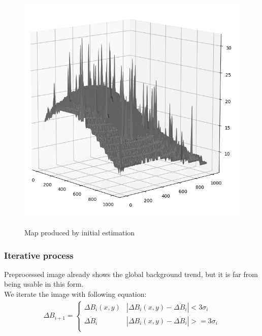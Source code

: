\documentclass[12pt, a4paper, oneside]{book}
\begin{document}
\begin{figure}[!hbt]
    \begin{center}
        \includegraphics[scale=1.30]{images/background_initial_guess.png}
        \label{img:background_initial_guess}
        \caption{Map produced by initial estimation}
    \end{center}
\end{figure}

\subsubsection{Iterative process}
Preprocessed image already shows the global background trend, but it is far from being usable in this form.\\
We iterate the image with following equation: \\
\begin{gather}
    \Delta B_{i+1} =
    \begin{cases}
        \Delta B_i(x,y) & |\Delta B_i(x,y)-\overline{\Delta B_i}| < 3\sigma_i\\
        \overline{\Delta B_i}& |\Delta B_i(x,y)-\overline{\Delta B_i}| >= 3\sigma_i\\
    \end{cases}
\end{gather}
\end{document}
